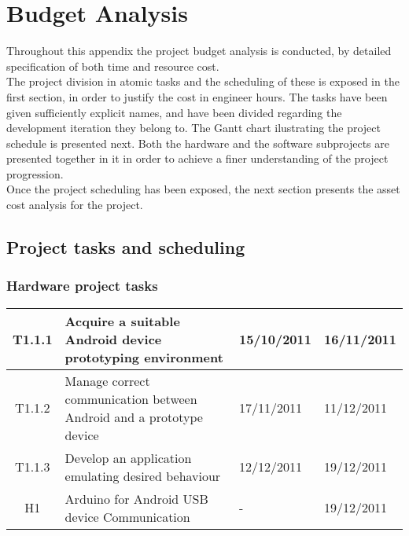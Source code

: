 \chapter{Budget Analysis}
\label{ch:budget}

\newcommand*\cleartoleftpage{%
  \clearpage
  \ifodd\value{page}\hbox{}\newpage\fi
}

	Throughout this appendix the project budget analysis is conducted, by detailed specification of both time and resource cost.\\

	The project division in atomic tasks and the scheduling of these is exposed in the first section, in order to justify the cost in engineer hours. The tasks have been given sufficiently explicit names, and have been divided regarding the development iteration they belong to. The Gantt chart ilustrating the project schedule is presented next. Both the hardware and the software subprojects are presented together in it in order to achieve a finer understanding of the project progression.\\

	Once the project scheduling has been exposed, the next section presents the asset cost analysis for the project.\\
	
	\section{Project tasks and scheduling}

		\subsection{Hardware project tasks}
		\begin{tabular}{| c | p{6cm} | l | l |} %
		\hline
			T1.1.1 & Acquire a suitable Android device prototyping environment & 15/10/2011 & 16/11/2011\\ \hline
			T1.1.2 & Manage correct communication between Android and a prototype 		device & 17/11/2011 & 11/12/2011\\ \hline
			T1.1.3 & Develop an application emulating desired behaviour & 12/12/2011 & 19/12/2011\\ \hline
H1 & Arduino for Android USB device Communication & - & 19/12/2011\\ \hline
		\end{tabular}\\\\

